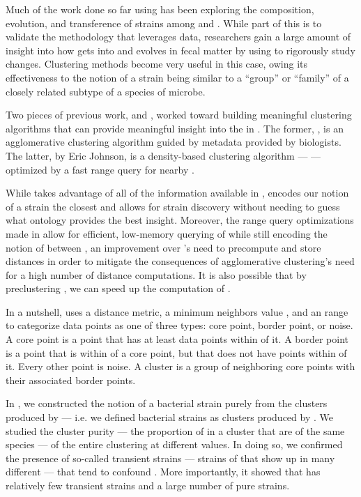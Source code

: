 Much of the work done so far using \cplop{} has been exploring the composition, evolution, and transference of strains among \hosts{} and \spec{}.
While part of this is to validate the \mst{} methodology that leverages \cplop{} data, researchers gain a large amount of insight into how \ecoli{} gets into and evolves in fecal matter by using \pyros{} to rigorously study changes.
Clustering methods become very useful in this case, owing its effectiveness to the notion of a strain being similar to a ``group'' or ``family'' of a closely related subtype of a species of microbe.

Two pieces of previous work, \cite{montana2013ontological, montana2013algorithms} and \cite{johnson2015density}, worked toward building meaningful clustering algorithms that can provide meaningful insight into the \ecoli{} \isols{} in \cplop{}.
The former, \ohclust{}, is an agglomerative clustering algorithm guided by metadata provided by biologists.
The latter, by Eric Johnson, is a density-based clustering algorithm --- \dbscan{} --- optimized by a fast range query for nearby \isols{}.

While \ohclust{} takes advantage of all of the information available in \cplop{}, \dbscan{} encodes our notion of a strain the closest and allows for strain discovery without needing to guess what ontology provides the best insight.
Moreover, the range query optimizations made in \cite{johnson2015density} allow for efficient, low-memory querying of \isols{} while still encoding the notion of \pearson{} between \isols{}, an improvement over \ohclust{}'s need to precompute and store distances in order to mitigate the consequences of agglomerative clustering's need for a high number of distance computations.
It is also possible that by preclustering \isols{}, we can speed up the computation of \krap{}.

In a nutshell, \dbscan{} uses a distance metric, a minimum neighbors value \minneigh{}, and an \eps{} range to categorize data points as one of three types: core point, border point, or noise.
A core point is a point that has at least \minneigh{} data points within \eps{} of it. 
A border point is a point that is within \eps{} of a core point, but that does not have \minneigh{} points within \eps{} of it. Every other point is noise. 
A cluster is a group of neighboring core points with their associated border points.

In \cite{DBLP:conf/bcb/McGovernJDBKV16}, we constructed the notion of a bacterial strain purely from the clusters produced by \dbscan{} --- i.e. we defined bacterial strains as clusters produced by \dbscan{}.
We studied the cluster purity --- the proportion of \isols{} in a cluster that are of the same species --- of the entire clustering at different \minneigh{} values.
In doing so, we confirmed the presence of so-called transient \ecoli{} strains --- strains of \ecoli{} that show up in many different \spec{} --- that tend to confound \mst{}.
More importantly, it showed that \cplop{} has relatively few transient strains and a large number of pure strains.

